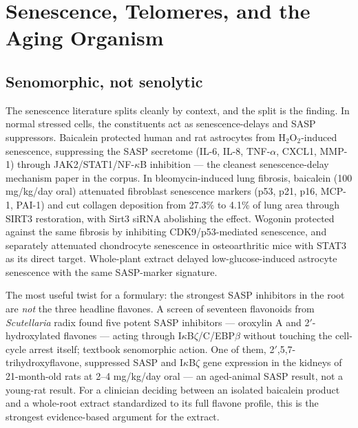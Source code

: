 
\section{Senescence, Telomeres, and the Aging Organism}
\label{sec:senes}

\subsection{Senomorphic, not senolytic}

The senescence literature splits cleanly by context, and the split is the finding. In normal stressed cells, the constituents act as senescence-delays and SASP suppressors. Baicalein protected human and rat astrocytes from H$_2$O$_2$-induced senescence, suppressing the SASP secretome (IL-6, IL-8, TNF-$\alpha$, CXCL1, MMP-1) through JAK2/STAT1/NF-$\kappa$B inhibition --- the cleanest senescence-delay mechanism paper in the corpus. In bleomycin-induced lung fibrosis, baicalein (100 mg/kg/day oral) attenuated fibroblast senescence markers (p53, p21, p16, MCP-1, PAI-1) and cut collagen deposition from 27.3\% to 4.1\% of lung area through SIRT3 restoration, with Sirt3 siRNA abolishing the effect. Wogonin protected against the same fibrosis by inhibiting CDK9/p53-mediated senescence, and separately attenuated chondrocyte senescence in osteoarthritic mice with STAT3 as its direct target. Whole-plant extract delayed low-glucose-induced astrocyte senescence with the same SASP-marker signature.

The most useful twist for a formulary: the strongest SASP inhibitors in the root are \emph{not} the three headline flavones. A screen of seventeen flavonoids from \textit{Scutellaria} radix found five potent SASP inhibitors --- oroxylin A and 2$'$-hydroxylated flavones --- acting through I$\kappa$B$\zeta$/C/EBP$\beta$ without touching the cell-cycle arrest itself; textbook senomorphic action. One of them, 2$'$,5,7-trihydroxyflavone, suppressed SASP and I$\kappa$B$\zeta$ gene expression in the kidneys of 21-month-old rats at 2--4 mg/kg/day oral --- an aged-animal SASP result, not a young-rat result. For a clinician deciding between an isolated baicalein product and a whole-root extract standardized to its full flavone profile, this is the strongest evidence-based argument for the extract.

